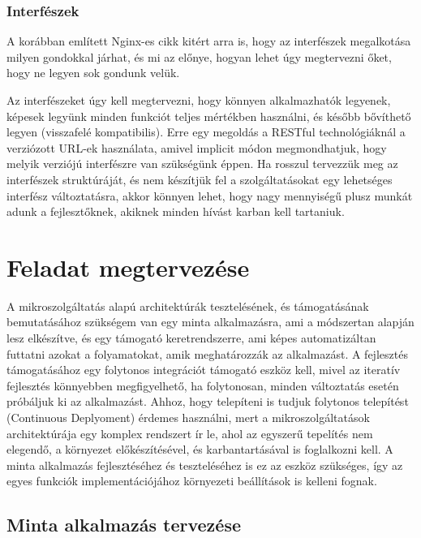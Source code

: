 \documentclass[11pt,magyar,a4paper,twoside,]{report}
\begin{document}
\subsection{Interfészek}\label{interfuxe9szek}

A korábban említett Nginx-es cikk kitért arra is, hogy az interfészek
megalkotása milyen gondokkal járhat, és mi az előnye, hogyan lehet úgy
megtervezni őket, hogy ne legyen sok gondunk velük.

Az interfészeket úgy kell megtervezni, hogy könnyen alkalmazhatók
legyenek, képesek legyünk minden funkciót teljes mértékben használni, és
később bővíthető legyen (visszafelé kompatibilis). Erre egy megoldás a
RESTful technológiáknál a verziózott URL-ek használata, amivel implicit
módon megmondhatjuk, hogy melyik verziójú interfészre van szükségünk
éppen. Ha rosszul tervezzük meg az interfészek struktúráját, és nem
készítjük fel a szolgáltatásokat egy lehetséges interfész változtatásra,
akkor könnyen lehet, hogy nagy mennyiségű plusz munkát adunk a
fejlesztőknek, akiknek minden hívást karban kell tartaniuk.

\chapter{Feladat megtervezése}\label{feladat-megtervezuxe9se}

A mikroszolgáltatás alapú architektúrák tesztelésének, és támogatásának
bemutatásához szükségem van egy minta alkalmazásra, ami a módszertan
alapján lesz elkészítve, és egy támogató keretrendszerre, ami képes
automatizáltan futtatni azokat a folyamatokat, amik meghatározzák az
alkalmazást. A fejlesztés támogatásához egy folytonos integrációt
támogató eszköz kell, mivel az iteratív fejlesztés könnyebben
megfigyelhető, ha folytonosan, minden változtatás esetén próbáljuk ki az
alkalmazást. Ahhoz, hogy telepíteni is tudjuk folytonos telepítést
(Continuous Deplyoment) érdemes használni, mert a mikroszolgáltatások
architektúrája egy komplex rendszert ír le, ahol az egyszerű tepelítés
nem elegendő, a környezet előkészítésével, és karbantartásával is
foglalkozni kell. A minta alkalmazás fejlesztéséhez és teszteléséhez is
ez az eszköz szükséges, így az egyes funkciók implementációjához
környezeti beállítások is kelleni fognak.

\section{Minta alkalmazás
tervezése}\label{minta-alkalmazuxe1s-tervezuxe9se}
\end{document}
